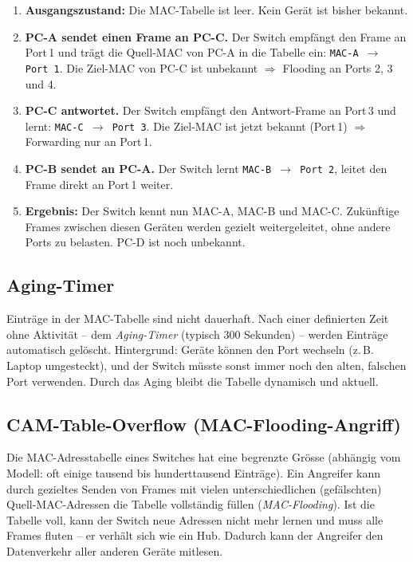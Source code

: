 \documentclass[11pt, oneside, numbers=nönddot]{scrbook}
\begin{document}
\begin{enumerate}
\item \textbf{Ausgangszustand:} Die MAC-Tabelle ist leer. Kein Gerät ist bisher bekannt.
\item \textbf{PC-A sendet einen Frame an PC-C.} Der Switch empfängt den Frame an Port\,1 und trägt die Quell-MAC von PC-A in die Tabelle ein: \texttt{MAC-A $\rightarrow$ Port 1}. Die Ziel-MAC von PC-C ist unbekannt $\Rightarrow$ Flooding an Ports 2, 3 und 4.
\item \textbf{PC-C antwortet.} Der Switch empfängt den Antwort-Frame an Port\,3 und lernt: \texttt{MAC-C $\rightarrow$ Port 3}. Die Ziel-MAC ist jetzt bekannt (Port\,1) $\Rightarrow$ Forwarding nur an Port\,1.
\item \textbf{PC-B sendet an PC-A.} Der Switch lernt \texttt{MAC-B $\rightarrow$ Port 2}, leitet den Frame direkt an Port\,1 weiter.
\item \textbf{Ergebnis:} Der Switch kennt nun MAC-A, MAC-B und MAC-C. Zukünftige Frames zwischen diesen Geräten werden gezielt weitergeleitet, ohne andere Ports zu belasten. PC-D ist noch unbekannt.
\end{enumerate}

\subsection{Aging-Timer}
Einträge in der MAC-Tabelle sind nicht dauerhaft. Nach einer definierten Zeit ohne Aktivität -- dem \textit{Aging-Timer} (typisch 300 Sekunden) -- werden Einträge automatisch gelöscht. Hintergrund: Geräte können den Port wechseln (z.\,B. Laptop umgesteckt), und der Switch müsste sonst immer noch den alten, falschen Port verwenden. Durch das Aging bleibt die Tabelle dynamisch und aktuell.

\subsection{CAM-Table-Overflow (MAC-Flooding-Angriff)}
Die MAC-Adresstabelle eines Switches hat eine begrenzte Grösse (abhängig vom Modell: oft einige tausend bis hunderttausend Einträge). Ein Angreifer kann durch gezieltes Senden von Frames mit vielen unterschiedlichen (gefälschten) Quell-MAC-Adressen die Tabelle vollständig füllen (\textit{MAC-Flooding}). Ist die Tabelle voll, kann der Switch neue Adressen nicht mehr lernen und muss alle Frames fluten -- er verhält sich wie ein Hub. Dadurch kann der Angreifer den Datenverkehr aller anderen Geräte mitlesen.
\end{document}
